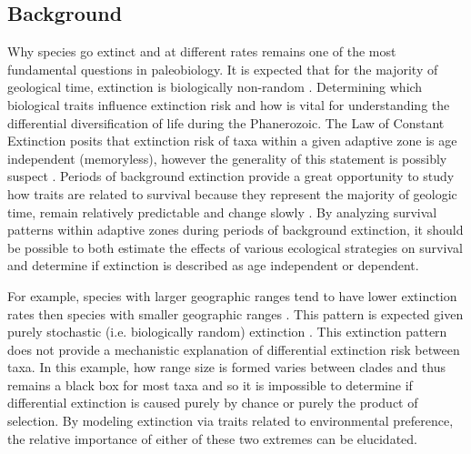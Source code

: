 \documentclass[11pt,letterpaper]{article}
\begin{document}
\subsection{Background}
Why species go extinct and at different rates remains one of the most fundamental questions in paleobiology. It is expected that for the majority of geological time, extinction is biologically non-random \citep{Jablonski1986,Alexander1977,Harnik2011,Johnson2002b,Kitchell1986,Nurnberg2013a,Payne2007}. Determining which biological traits influence extinction risk and how is vital for understanding the differential diversification of life during the Phanerozoic. The Law of Constant Extinction \citep{VanValen1973} posits that extinction risk of taxa within a given adaptive zone is age independent (memoryless), however the generality of this statement is possibly suspect \citep{Drake2014,Raup1975,Sepkoski1975,Finnegan2008}. Periods of background extinction provide a great opportunity to study how traits are related to survival because they represent the majority of geologic time, remain relatively predictable and change slowly \citep{Jablonski1986,Raup1988}. By analyzing survival patterns within adaptive zones during periods of background extinction, it should be possible to both estimate the effects of various ecological strategies on survival and determine if extinction is described as age independent or dependent.

For example, species with larger geographic ranges tend to have lower extinction rates then species with smaller geographic ranges \citep{Jablonski1986,Harnik2013,Nurnberg2013a,Jablonski2003,Roy2009c}. This pattern is expected given purely stochastic (i.e. biologically random) extinction \citep{Raup1991b}. This extinction pattern does not provide a mechanistic explanation of differential extinction risk between taxa. In this example, how range size is formed varies between clades and thus remains a black box for most taxa \citep{Jablonski1987} and so it is impossible to determine if differential extinction is caused purely by chance or purely the product of selection. By modeling extinction via traits related to environmental preference, the relative importance of either of these two extremes can be elucidated.
\end{document}
